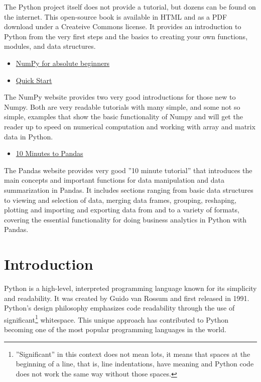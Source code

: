 The Python project itself does not provide a tutorial, but dozens can be found on the internet. This open-source book is available in HTML and as a PDF download under a Createive Commons license. It provides an introduction to Python from the very first steps and the basics to creating your own functions, modules, and data structures. 

\begin{resourcebox}
\begin{itemize}
\item \href{https://numpy.org/doc/stable/user/absolute_beginners.html}{NumPy for absolute beginners}
\item \href{https://numpy.org/doc/stable/user/quickstart.html}{Quick Start}
\end{itemize}
\end{resourcebox}

The NumPy website provides two very good introductions for those new to Numpy. Both are very readable tutorials with many simple, and some not so simple, examples that show the basic functionality of Numpy and will get the reader up to speed on numerical computation and working with array and matrix data in Python.

\begin{resourcebox}
\begin{itemize}
\item \href{http://pandas.pydata.org/docs/user_guide/10min.html}{10 Minutes to Pandas}\\
\end{itemize}
\end{resourcebox}

The Pandas website provides very good ''10 minute tutorial'' that introduces the main concepts and important functions for data manipulation and data summarization in Pandas. It includes sections ranging from basic data structures to viewing and selection of data, merging data frames, grouping, reshaping, plotting and importing and exporting data from and to a variety of formats, covering the essential functionality for doing business analytics in Python with Pandas.


\section{Introduction}

Python is a high-level, interpreted programming language known for its simplicity and readability. It was created by Guido van Rossum and first released in 1991. Python's design philosophy emphasizes code readability through the use of significant\footnote{''Significant'' in this context does not mean lots, it means that spaces at the beginning of a line, that is, line indentations, have meaning and Python code does not work the same way without those spaces.} whitespace. This unique approach has contributed to Python becoming one of the most popular programming languages in the world.

